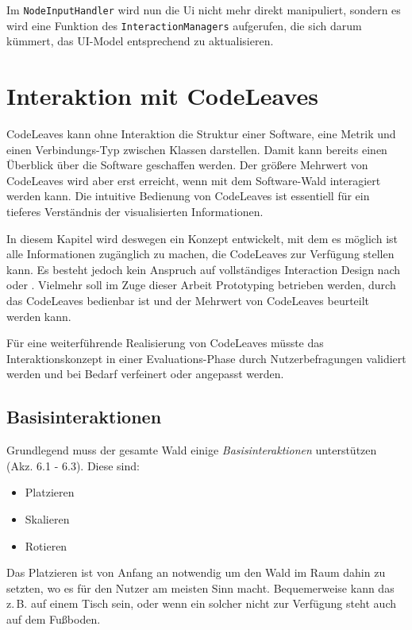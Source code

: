 Im \texttt{NodeInputHandler} wird nun die Ui nicht mehr direkt manipuliert, sondern es wird eine Funktion des \texttt{InteractionManagers} aufgerufen, die sich darum kümmert, das UI-Model entsprechend zu aktualisieren.

\chapter{Interaktion mit CodeLeaves}
\label{ch:interaction}

CodeLeaves kann ohne Interaktion die Struktur einer Software, eine Metrik und einen Verbindungs-Typ zwischen Klassen darstellen. Damit kann bereits einen Überblick über die Software geschaffen werden. Der größere Mehrwert von CodeLeaves wird aber erst erreicht, wenn mit dem Software-Wald interagiert werden kann. Die intuitive Bedienung von CodeLeaves ist essentiell für ein tieferes Verständnis der visualisierten Informationen.

In diesem Kapitel wird deswegen ein Konzept entwickelt, mit dem es möglich ist alle Informationen zugänglich zu machen, die CodeLeaves zur Verfügung stellen kann. Es besteht jedoch kein Anspruch auf vollständiges Interaction Design nach \cite{goodwin2011designing} oder \cite{cooper2014face}. Vielmehr soll im Zuge dieser Arbeit Prototyping betrieben werden, durch das CodeLeaves bedienbar ist und der Mehrwert von CodeLeaves beurteilt werden kann.

Für eine weiterführende Realisierung von CodeLeaves müsste das Interaktionskonzept in einer Evaluations-Phase durch Nutzerbefragungen validiert werden und bei Bedarf verfeinert oder angepasst werden.

\section{Basisinteraktionen}
Grundlegend muss der gesamte Wald einige \textit{Basisinteraktionen} unterstützen (Akz. 6.1 - 6.3). Diese sind:

\begin{itemize}
  \item Platzieren
  \item Skalieren
  \item Rotieren
\end{itemize}

Das Platzieren ist von Anfang an notwendig um den Wald im Raum dahin zu setzten, wo es für den Nutzer am meisten Sinn macht. Bequemerweise kann das z.\,B. auf einem Tisch sein, oder wenn ein solcher nicht zur Verfügung steht auch auf dem Fußboden.

